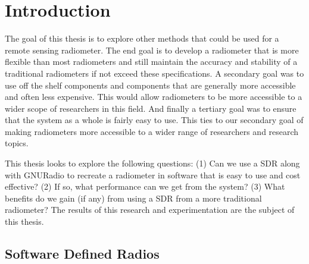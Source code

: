 \section{Introduction}
The goal of this thesis is to explore other methods that could be used for a remote sensing radiometer.  The end goal is to develop a radiometer that is more flexible than most radiometers and still maintain the accuracy and stability of a traditional radiometers if not exceed these specifications.  A secondary goal was to use off the shelf components and components that are generally more accessible and often less expensive.  This would allow radiometers to be more accessible to a wider scope of researchers in this field.  And finally a tertiary goal was to ensure that the system as a whole is fairly easy to use.  This ties to our secondary goal of making radiometers more accessible to a wider range of researchers and research topics.


This thesis looks to explore the following questions: (1) Can we use a SDR along with GNURadio to recreate a radiometer in software that is easy to use and cost effective?  (2) If so, what performance can we get from the system?  (3) What benefits do we gain (if any) from using a SDR from a more traditional radiometer?  The results of this research and experimentation are the subject of this thesis.


\subsection{Software Defined Radios}

